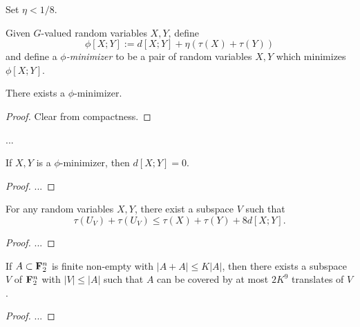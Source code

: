 Set $\eta < 1/8$.

\begin{definition}  Given $G$-valued random variables $X,Y$, define
$$ \phi[X;Y] := d[X;Y] + \eta(\tau(X) + \tau(Y))$$
and define a \emph{$\phi$-minimizer} to be a pair of random variables $X,Y$ which minimizes $\phi[X;Y]$.
\end{definition}

\begin{lemma}\label{phi-min-exist}  There exists a $\phi$-minimizer.
\end{lemma}

\begin{proof} Clear from compactness.
\end{proof}

...

\begin{proposition}  If $X,Y$ is a $\phi$-minimizer, then $d[X;Y] = 0$.
\end{proposition}

\begin{proof}
  ...
\end{proof}


\begin{proposition}  For any random variables $X,Y$, there exist  a subspace $V$ such that
  $$ \tau(U_V) + \tau(U_V) \leq \tau(X) + \tau(Y) + 8 d[X;Y].$$
\end{proposition}

\begin{proof}
  ...
\end{proof}


\begin{theorem}[PFR with \texorpdfstring{$C=9$}{C=9}]  If $A \subset {\bf F}_2^n$ is finite non-empty with $|A+A| \leq K|A|$, then there exists a subspace $V$ of ${\bf F}_2^n$ with $|V| \leq |A|$ such that $A$ can be covered by at most $2K^9$ translates of $V$.
\end{theorem}

\begin{proof}
  ...
\end{proof}
